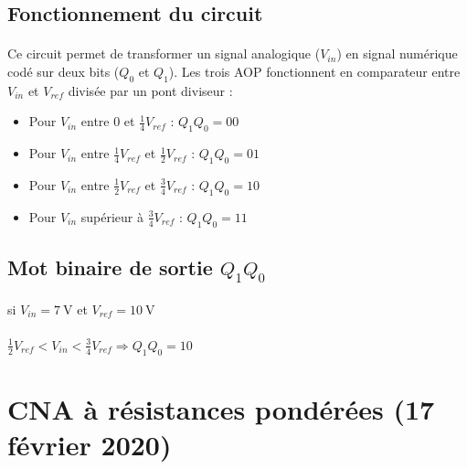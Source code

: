 \documentclass{article}
\begin{document}
\subsection{Fonctionnement du circuit}
\paragraph{}
Ce circuit permet de transformer un signal analogique ($V_{in}$) en signal numérique codé sur deux bits ($Q_0$ et $Q_1$). Les trois AOP fonctionnent en comparateur entre $V_{in}$ et $V_{ref}$ divisée par un pont diviseur :
\begin{itemize}
    \item Pour $V_{in}$ entre 0 et $\frac{1}{4} V_{ref}$ : $Q_1Q_0 = 00$
    \item Pour $V_{in}$ entre $\frac{1}{4} V_{ref}$ et $\frac{1}{2} V_{ref}$ : $Q_1Q_0 = 01$
    \item Pour $V_{in}$ entre $\frac{1}{2} V_{ref}$ et $\frac{3}{4} V_{ref}$ : $Q_1Q_0 = 10$
    \item Pour $V_{in}$ supérieur à $\frac{3}{4} V_{ref}$ : $Q_1Q_0 = 11$
\end{itemize}

\subsection{Mot binaire de sortie $Q_1Q_0$}
\paragraph{}
si $V_{in} = \SI{7}{\volt}$ et $V_{ref} = \SI{10}{\volt}$

\paragraph{}
$\frac{1}{2} V_{ref} < V_{in} < \frac{3}{4} V_{ref} \Rightarrow Q_1Q_0 = 10$


\newpage
\section{CNA à résistances pondérées (17 février 2020)}
\end{document}

